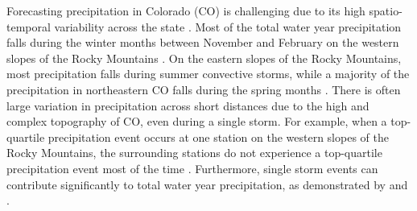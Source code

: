\documentclass[draft]{agujournal2019}
\begin{document}
Forecasting precipitation in Colorado (CO) is challenging due to its high spatio-temporal variability across the state \cite{Cowie1986ColoradoAnalysis, Kirk2018LargeBasin, Lute2014RoleStates, Mahoney2015ClimatologyVariability, Serreze2001CharacteristicsData}. Most of the total water year precipitation falls during the winter months between November and February on the western slopes of the Rocky Mountains \cite{Doesken1984Period., Harvey2019CitizensFrom, Mahoney2015ClimatologyVariability}. On the eastern slopes of the Rocky Mountains, most precipitation falls during summer convective storms, while a majority of the precipitation in northeastern CO falls during the spring months \cite{Doesken1984Period., Harvey2019CitizensFrom, Mahoney2015ClimatologyVariability}. There is often large variation in precipitation across short distances due to the high and complex topography of CO, even during a single storm. For example, when a top-quartile precipitation event occurs at one station on the western slopes of the Rocky Mountains, the surrounding stations do not experience a top-quartile precipitation event most of the time \cite{Serreze2001CharacteristicsData}. Furthermore, single storm events can contribute significantly to total water year precipitation, as demonstrated by  and .

\end{document}
